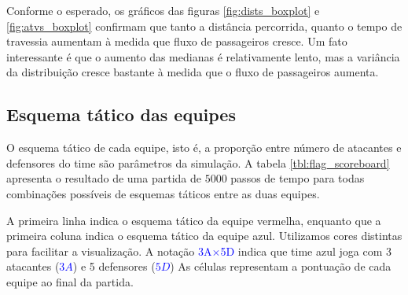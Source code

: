 \documentclass[preprint,12pt]{elsarticle}
\newcommand{\blu}[1]{\textcolor{blue}{#1}}
\begin{document}
Conforme o esperado, os gráficos das figuras \ref{fig:dists_boxplot} e \ref{fig:atvs_boxplot} confirmam que tanto a distância percorrida, quanto o tempo de travessia aumentam à medida que fluxo de passageiros cresce. Um fato interessante é que o aumento das medianas é relativamente lento, mas a variância da distribuição cresce bastante à medida que o fluxo de passageiros aumenta.

\subsection{Esquema tático das equipes}
\label{subsec:esquema_tatico}

O esquema tático de cada equipe, isto é, a proporção entre número de atacantes e defensores do time são parâmetros da simulação. A tabela \ref{tbl:flag_scoreboard} apresenta o resultado de uma partida de $5000$ passos de tempo para todas combinações possíveis de esquemas táticos entre as duas equipes.

A primeira linha indica o esquema tático da equipe vermelha, enquanto que a primeira coluna indica o esquema tático da equipe azul. Utilizamos cores distintas para facilitar a visualização. A notação \blu{3A$\times$5D} indica que time azul joga com 3 atacantes (\blu{$3A$}) e 5 defensores (\blu{$5D$}) As células representam a pontuação de cada equipe ao final da partida. 
\end{document}
